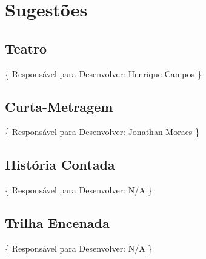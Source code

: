 \chapter[Sugestões]{Sugestões}
\label{chap:sugestoes}
	\section[Teatro]{Teatro}
	\label{sec:sugestoes_teatro}
		\{ Responsável para Desenvolver: Henrique Campos \}

	\section[Curta-Metragem]{Curta-Metragem}
	\label{sec:sugestoes_curtaMetragem}
		\{ Responsável para Desenvolver: Jonathan Moraes \}

	\section[História Contada]{História Contada}
	\label{sec:sugestoes_historiaContada}
		\{ Responsável para Desenvolver: N/A \}

	\section[Trilha Encenada]{Trilha Encenada}
	\label{sec:sugestoes_trilhaEncenada}
		\{ Responsável para Desenvolver: N/A \}